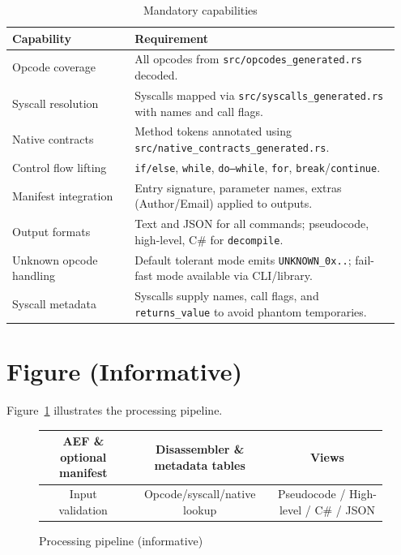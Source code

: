 \documentclass[11pt]{article}
\begin{document}
\begin{table}[h]
\centering
\begin{tabular}{@{}p{0.3\linewidth}p{0.65\linewidth}@{}}
\toprule
Capability & Requirement \\
\midrule
Opcode coverage & All opcodes from \texttt{src/opcodes\_generated.rs} decoded.\\
Syscall resolution & Syscalls mapped via \texttt{src/syscalls\_generated.rs} with names and call flags.\\
Native contracts & Method tokens annotated using \texttt{src/native\_contracts\_generated.rs}.\\
Control flow lifting & \texttt{if/else}, \texttt{while}, \texttt{do--while}, \texttt{for}, \texttt{break}/\texttt{continue}.\\
Manifest integration & Entry signature, parameter names, extras (Author/Email) applied to outputs.\\
Output formats & Text and JSON for all commands; pseudocode, high-level, C\# for \texttt{decompile}.\\
Unknown opcode handling & Default tolerant mode emits \texttt{UNKNOWN\_0x..}; fail-fast mode available via CLI/library.\\
Syscall metadata & Syscalls supply names, call flags, and \texttt{returns\_value} to avoid phantom temporaries.\\
\bottomrule
\end{tabular}
\caption{Mandatory capabilities}\label{tab:features}
\end{table}

\section{Figure (Informative)}
Figure~\ref{fig:pipeline} illustrates the processing pipeline.

\begin{figure}[h]
\centering
\begin{tabular}{|c|c|c|}
\hline
AEF \& optional manifest & Disassembler \& metadata tables & Views \\
\hline
Input validation & Opcode/syscall/native lookup & Pseudocode / High-level / C\# / JSON \\
\hline
\end{tabular}
\caption{Processing pipeline (informative)}\label{fig:pipeline}
\end{figure}
\end{document}
